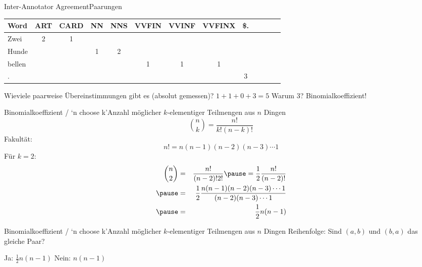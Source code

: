 \documentclass[aspectratio=169]{beamer}
\begin{document}
\begin{frame}[fragile]{Inter-Annotator Agreement}{Paarungen}

\begin{tabular}{lcccccccccccc}
\toprule
Word & ART & CARD & NN & NNS & VVFIN & VVINF & VVFINX & \$. \\
\midrule
Zwei & 2 & 1 \\
Hunde & & & 1 & 2 \\
bellen & & & & & 1 & 1 & 1 \\
. & & & & & & & & \alert<3>{3} \\
\bottomrule
\end{tabular}

\begin{outline}
\1 Wieviele paarweise Übereinstimmungen gibt es (absolut gemessen)?
\pause
\2 $1 + 1 + 0 + 3 = 5$
\pause
\1 Warum 3? Binomialkoeffizient!
\end{outline}

\end{frame}

\begin{frame}{Binomialkoeffizient / `n choose k'}{Anzahl möglicher $k$-elementiger Teilmengen aus $n$ Dingen}
\begin{equation*}
{n\choose k} = \frac{n!}{k!(n-k)!}
\end{equation*}
\pause
Fakultät:
\begin{equation*}
n! = n(n-1)(n-2)(n-3)\cdots 1
\end{equation*}
\pause
Für $k=2$:
\begin{eqnarray*}
{n\choose 2} & = & \frac{n!}{(n-2)!2!} \pause = \frac{1}{2}\frac{n!}{(n-2)!} \\
\pause
& = & \frac{1}{2}\frac{n(n-1)(n-2)(n-3)\cdots 1}{(n-2)(n-3)\cdots 1} \\
\pause
& = & \frac{1}{2}n(n-1)	\\
\end{eqnarray*}
\end{frame}

\begin{frame}{Binomialkoeffizient / `n choose k'}{Anzahl möglicher $k$-elementiger Teilmengen aus $n$ Dingen}
Reihenfolge: Sind $(a,b)$ und $(b,a)$ das gleiche Paar?
\begin{outline}
\1 Ja: $\frac{1}{2}n(n-1)$
\1 Nein: $n(n-1)$
\end{outline}
\end{frame}
\end{document}
